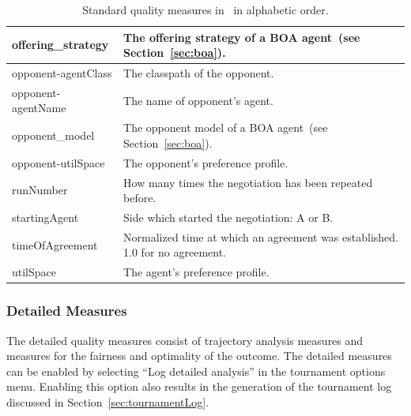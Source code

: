 \documentclass[]{article}
\begin{document}
\begin{table}[h!]
\begin{tabular}{|p{4.7cm}|p{9.2cm}|}
		offering\_strategy & The offering strategy of a BOA agent~(see Section~\ref{sec:boa}). \\[-0.3ex]\hline
		opponent-agentClass & The classpath of the opponent.\\[-0.3ex]\hline
		opponent-agentName & The name of opponent's agent.\\[-0.3ex]\hline
		opponent\_model & The opponent model of a BOA agent~(see Section~\ref{sec:boa}). \\[-0.3ex]\hline
		opponent-utilSpace & The opponent's preference profile.\\[-0.3ex]\hline
		runNumber & How many times the negotiation has been repeated before.\\[-0.3ex]\hline
		startingAgent & Side which started the negotiation: A or B.\\[-0.3ex]\hline
		timeOfAgreement & Normalized time at which an agreement was established. 1.0 for no agreement. \\[-0.3ex]\hline
		utilSpace & The agent's preference profile.\\[-0.3ex]
		\hline
		\hline
	\end{tabular}
	\caption{Standard quality measures in \Genius~in alphabetic order.}
	\label{tab:standardmeasures}
\end{table}

\subsubsection{Detailed Measures}\label{sec:detailedmeasures}
The detailed quality measures consist of trajectory analysis measures and measures for the fairness and optimality of the outcome. The detailed measures can be enabled by selecting ``Log detailed analysis'' in the tournament options menu. Enabling this option also results in the generation of the tournament log discussed in Section~\ref{sec:tournamentLog}.
\end{document}
